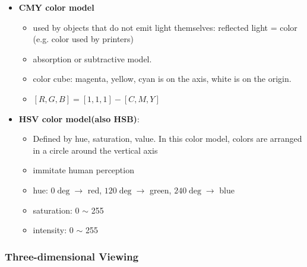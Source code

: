 \documentclass{standalone}
\begin{document}
\begin{itemize}
		\pagebreak

		\item \textbf{CMY color model}
			\begin{itemize}
			 	\item used by objects that do not emit light themselves: reflected light = color (e.g. color used by printers)
			 	\item absorption or subtractive model.
			 	\item color cube: magenta, yellow, cyan is on the axis, white is on the origin.
			 	\item $[R, G, B] = [1, 1, 1] - [C, M, Y]$
			 \end{itemize}
		\item \textbf{HSV color model(also HSB)}: 
			\begin{itemize} 
				\item Defined by hue, saturation, value. In this color model, colors are arranged in a circle around the vertical axis
				\item immitate human perception
				\item hue: $0\deg \rightarrow$ red, $120\deg \rightarrow$ green, $240\deg \rightarrow$ blue
				\item saturation: 0 $\sim$ 255
				\item intensity: 0 $\sim$ 255
			\end{itemize}
\end{itemize}
\subsubsection{Three-dimensional Viewing}
\end{document}
